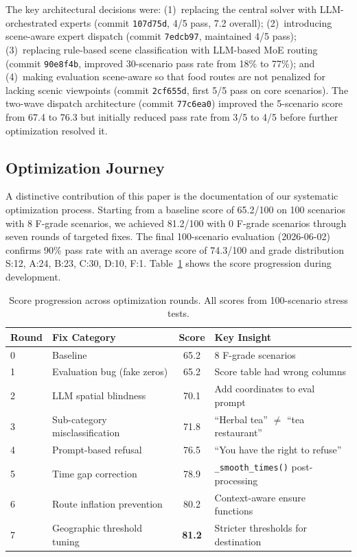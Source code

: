 The key architectural decisions were: (1)~replacing the central solver with LLM-orchestrated experts (commit \texttt{107d75d}, 4/5 pass, 7.2 overall); (2)~introducing scene-aware expert dispatch (commit \texttt{7edcb97}, maintained 4/5 pass); (3)~replacing rule-based scene classification with LLM-based MoE routing (commit \texttt{90e8f4b}, improved 30-scenario pass rate from 18\% to 77\%); and (4)~making evaluation scene-aware so that food routes are not penalized for lacking scenic viewpoints (commit \texttt{2cf655d}, first 5/5 pass on core scenarios). The two-wave dispatch architecture (commit \texttt{77c6ea0}) improved the 5-scenario score from 67.4 to 76.3 but initially reduced pass rate from 3/5 to 4/5 before further optimization resolved it.

\subsection{Optimization Journey}
\label{sec:journey}

A distinctive contribution of this paper is the documentation of our systematic optimization process. Starting from a baseline score of 65.2/100 on 100 scenarios with 8 F-grade scenarios, we achieved 81.2/100 with 0 F-grade scenarios through seven rounds of targeted fixes. The final 100-scenario evaluation (2026-06-02) confirms 90\% pass rate with an average score of 74.3/100 and grade distribution S:12, A:24, B:23, C:30, D:10, F:1. Table~\ref{tab:progression} shows the score progression during development.

\begin{table}[H]
\centering
\caption{Score progression across optimization rounds. All scores from 100-scenario stress tests.}
\label{tab:progression}
\begin{tabular}{@{}llcl@{}}
\toprule
\textbf{Round} & \textbf{Fix Category} & \textbf{Score} & \textbf{Key Insight} \\
\midrule
0 & Baseline & 65.2 & 8 F-grade scenarios \\
1 & Evaluation bug (fake zeros) & 65.2 & Score table had wrong columns \\
2 & LLM spatial blindness & 70.1 & Add coordinates to eval prompt \\
3 & Sub-category misclassification & 71.8 & ``Herbal tea'' $\neq$ ``tea restaurant'' \\
4 & Prompt-based refusal & 76.5 & ``You have the right to refuse'' \\
5 & Time gap correction & 78.9 & \texttt{\_smooth\_times()} post-processing \\
6 & Route inflation prevention & 80.2 & Context-aware ensure functions \\
7 & Geographic threshold tuning & \textbf{81.2} & Stricter thresholds for destination \\
\bottomrule
\end{tabular}
\end{table}

